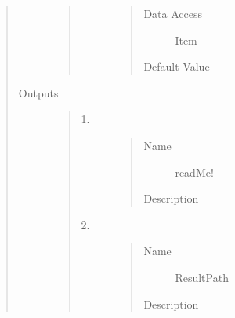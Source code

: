 \documentclass[letterpaper,10pt,english]{sphinxmanual}
\begin{document}
\begin{quote}
\begin{description}
\begin{quote}
\begin{description}
\begin{quote}
\begin{description}
\item[{Data Access}] \leavevmode
Item

\item[{Default Value}] \leavevmode
{}

\end{description}\end{quote}

\end{description}\end{quote}

\item[{Outputs}] \leavevmode\begin{quote}\begin{description}
\item[{1.}] \leavevmode\begin{quote}\begin{description}
\item[{Name}] \leavevmode
readMe!

\item[{Description}] \leavevmode
{}

\end{description}\end{quote}

\item[{2.}] \leavevmode\begin{quote}\begin{description}
\item[{Name}] \leavevmode
ResultPath

\item[{Description}] \leavevmode
{}

\end{description}\end{quote}

\end{description}\end{quote}

\end{description}\end{quote}
\end{document}
